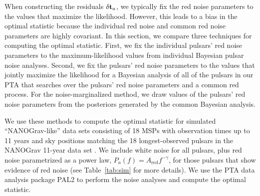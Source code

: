 \documentclass[twocolumn,aps,prd,superscriptaddress]{revtex4-1}
\newcommand{\res}{\ensuremath{\delta {\bf t}}}
\begin{document}
When constructing the residuals $\res_a$, 
we typically fix the red noise parameters to the values that 
maximize the likelihood. 
However, this leads to a bias in the optimal statistic 
because the individual red noise and common red noise parameters 
are highly covariant. 
In this section, we compare three techniques for computing the optimal statistic. 
First, we fix the individual pulsars' red noise parameters to the 
maximum-likelihood values from individual Bayesian pulsar noise analyses. 
Second, we fix the pulsars' red noise parameters to the 
values that jointly maximize the likelihood for a Bayesian analysis 
of all of the pulsars in our PTA 
that searches over the pulsars' red noise parameters and 
a common red process. 
For the noise-marginalized method, we draw values of the pulsars' 
red noise parameters from the posteriors generated by the common Bayesian analysis.

We use these methods to compute the optimal statistic 
for simulated ``NANOGrav-like'' data sets 
consisting of 18 MSPs with observation times up to 11 years 
and sky positions matching the 18 longest-observed pulsars in the 
NANOGrav 11-year data set \citep{abb+17}. 
We include white noise for all pulsars, plus 
red noise parametrized as a power law, $P_a(f) = A_\mathrm{red} f^{-\gamma}$, 
for those pulsars that show evidence of red noise 
(see Table~\ref{tab:sim} for more details).
We use the PTA data analysis package 
PAL2 %
\citep{evh17a}
to perform the noise analyses and compute the optimal statistic.
\end{document}
